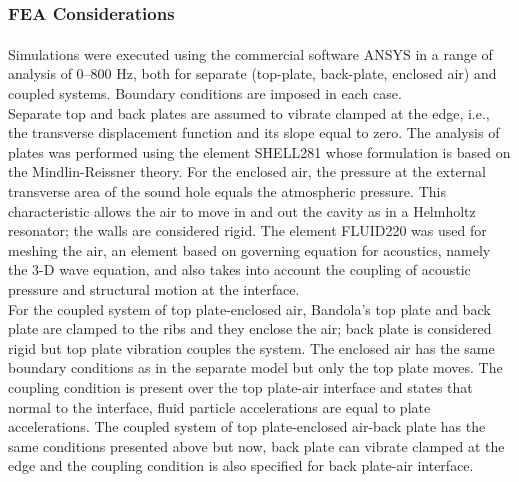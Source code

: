 \subsubsection{FEA Considerations}

Simulations were executed using the commercial software ANSYS\textsuperscript{\textregistered} in a range of analysis of {0--800 Hz}, both for separate (top-plate, back-plate, enclosed air) and coupled systems. Boundary conditions are imposed in each case.\\

Separate top and back plates are assumed to vibrate clamped at the edge, i.e., the transverse displacement function and its slope equal to zero. The analysis of plates was performed using the element SHELL281 whose formulation is based on the Mindlin-Reissner theory. For the enclosed air, the pressure at the external transverse area of the sound hole equals the atmospheric pressure. This characteristic allows the air to move in and out the cavity as in a Helmholtz resonator; the walls are considered rigid. The element FLUID220 was used for meshing the air, an element based on governing equation for acoustics, namely the 3-D wave equation, and also takes into account the coupling of acoustic pressure and structural motion at the interface.\\

For the coupled system of top plate-enclosed air, Bandola's top plate and back plate are clamped to the ribs and they enclose the air; back plate is considered rigid but top plate vibration couples the system. The enclosed air has the same boundary conditions as in the separate model but only the top plate moves. The coupling condition is present over the top plate-air interface and states that normal to the interface, fluid particle accelerations are equal to plate accelerations. The coupled system of top plate-enclosed air-back plate has the same conditions presented above but now, back plate can vibrate clamped at the edge and the coupling condition is also specified for back plate-air interface.



